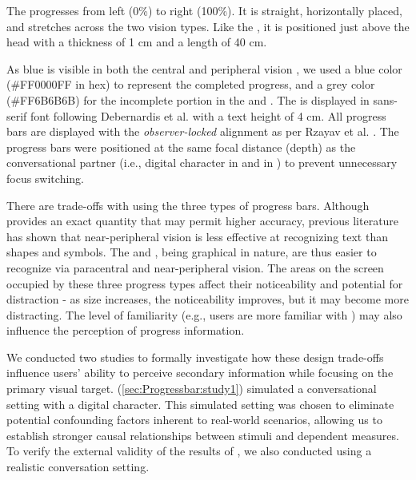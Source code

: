 The \linearbar{} progresses from left (0\%) to right (100\%). It is straight, horizontally placed, and stretches across the two vision types. Like the \textbar{}, it is positioned just above the head with a thickness of 1 cm and a length of 40 cm.

As blue is visible in both the central and peripheral vision \cite{chaturvedi_peripheral_2019}, we used a blue color (\#FF0000FF in hex) to represent the completed progress, and a grey color (\#FF6B6B6B) for the incomplete portion in the \circularbar{} and \linearbar{}. The \textbar{} is displayed in sans-serif font following Debernardis et al. \cite{debernardis_text_2014} with a text height of 4 cm. All progress bars are displayed with the \textit{observer-locked} alignment as per Rzayav et al. \cite{rzayev_effects_2020}. The progress bars were positioned at the same focal distance (depth) as the conversational partner (i.e., digital character in \studyone{} and \observer{} in \studytwo{}) to prevent unnecessary focus switching.
  
There are trade-offs with using the three types of progress bars. Although \textbar{} provides an exact quantity that may permit higher accuracy, previous literature has shown that near-peripheral vision is less effective at recognizing text than shapes and symbols. The \circularbar{} and \linearbar{}, being graphical in nature, are thus easier to recognize via paracentral and near-peripheral vision. The areas on the screen occupied by these three progress types affect their noticeability and potential for distraction - as size increases, the noticeability improves, but it may become more distracting. The level of familiarity (e.g., users are more familiar with \linearbar{}) may also influence the perception of progress information.

We conducted two studies to formally investigate how these design trade-offs influence users' ability to perceive secondary information while focusing on the primary visual target. \Studyone{} (\autoref{sec:Progressbar:study1}) simulated a conversational setting with a digital character. This simulated setting was chosen to eliminate potential confounding factors inherent to real-world scenarios, allowing us to establish stronger causal relationships between stimuli and dependent measures. To verify the external validity of the results of \studyone{}, we also conducted \studytwo{} using a realistic conversation setting.















